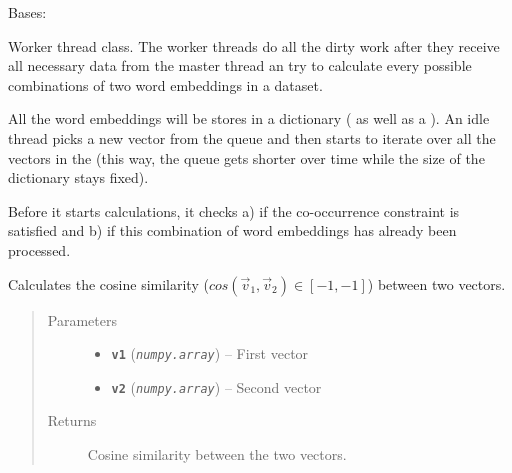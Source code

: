 \documentclass[letterpaper,10pt,english]{sphinxmanual}
\begin{document}
\begin{fulllineitems}
\label{src.mapping:src.mapping.mapthreading.MappingWorkerThread}
Bases: 

Worker thread class. The worker threads do all the dirty work after they receive all necessary data from the master
thread an try to calculate every possible combinations of two word embeddings in a dataset.

All the word embeddings will be stores in a dictionary ({\hyperref[src.mapping:src.mapping.mapthreading.VectorDict]{}} as well as a ).
An idle thread picks a new vector from the queue and then starts to iterate over all the vectors in the
{\hyperref[src.mapping:src.mapping.mapthreading.VectorDict]{}} (this way, the queue gets shorter over time while the size of the dictionary stays fixed).

Before it starts calculations, it checks a) if the co-occurrence constraint is satisfied and b) if this combination
of word embeddings has already been processed.

\begin{fulllineitems}
\label{src.mapping:src.mapping.mapthreading.MappingWorkerThread.cosine_similarity}
Calculates the cosine similarity (\(cos(\vec{v}_1, \vec{v}_2) \in [-1,-1]\)) between two vectors.
\begin{quote}\begin{description}
\item[{Parameters}] \leavevmode\begin{itemize}
\item {} 
\textbf{\texttt{v1}} (\emph{\texttt{numpy.array}}) -- First vector

\item {} 
\textbf{\texttt{v2}} (\emph{\texttt{numpy.array}}) -- Second vector

\end{itemize}

\item[{Returns}] \leavevmode
Cosine similarity between the two vectors.


\end{description}
\end{quote}
\end{fulllineitems}
\end{fulllineitems}
\end{document}
